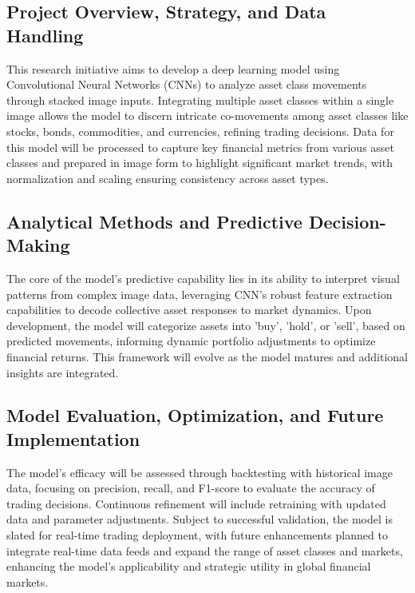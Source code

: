 \thesisspacing %

\subsection{Project Overview, Strategy, and Data Handling}
This research initiative aims to develop a deep learning model using Convolutional Neural Networks (CNNs) to analyze asset class movements through stacked image inputs. Integrating multiple asset classes within a single image allows the model to discern intricate co-movements among asset classes like stocks, bonds, commodities, and currencies, refining trading decisions. Data for this model will be processed to capture key financial metrics from various asset classes and prepared in image form to highlight significant market trends, with normalization and scaling ensuring consistency across asset types.

\subsection{Analytical Methods and Predictive Decision-Making}
The core of the model's predictive capability lies in its ability to interpret visual patterns from complex image data, leveraging CNN’s robust feature extraction capabilities to decode collective asset responses to market dynamics. Upon development, the model will categorize assets into 'buy', 'hold', or 'sell', based on predicted movements, informing dynamic portfolio adjustments to optimize financial returns. This framework will evolve as the model matures and additional insights are integrated.

\subsection{Model Evaluation, Optimization, and Future Implementation}
The model's efficacy will be assessed through backtesting with historical image data, focusing on precision, recall, and F1-score to evaluate the accuracy of trading decisions. Continuous refinement will include retraining with updated data and parameter adjustments. Subject to successful validation, the model is slated for real-time trading deployment, with future enhancements planned to integrate real-time data feeds and expand the range of asset classes and markets, enhancing the model’s applicability and strategic utility in global financial markets.
